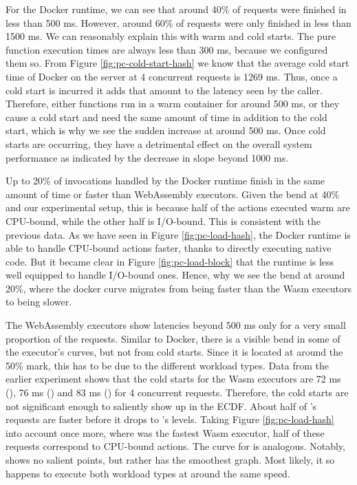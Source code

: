 For the Docker runtime, we can see that around 40\% of requests were finished in less than 500 ms. However, around 60\% of requests were only finished in less than 1500 ms. We can reasonably explain this with warm and cold starts. The pure function execution times are always less than 300 ms, because we configured them so. From Figure \ref{fig:pc-cold-start-hash} we know that the average cold start time of Docker on the server at 4 concurrent requests is 1269 ms. Thus, once a cold start is incurred it adds that amount to the latency seen by the caller. Therefore, either functions run in a warm container for around 500 ms, or they cause a cold start and need the same amount of time in addition to the cold start, which is why we see the sudden increase at around 500 ms. Once cold starts are occurring, they have a detrimental effect on the overall system performance as indicated by  the decrease in slope beyond 1000 ms.

Up to 20\% of invocations handled by the Docker runtime finish in the same amount of time or faster than WebAssembly executors. Given the bend at 40\% and our experimental setup, this is because half of the actions executed warm are CPU-bound, while the other half is I/O-bound. This is consistent with the previous data. As we have seen in Figure \ref{fig:pc-load-hash}, the Docker runtime is able to handle CPU-bound actions faster, thanks to directly executing native code. But it became clear in Figure \ref{fig:pc-load-block} that the runtime is less well equipped to handle I/O-bound ones. Hence, why we see the bend at around 20\%, where the docker curve migrates from being faster than the Wasm executors to being slower.

The WebAssembly executors show latencies beyond 500 ms only for a very small proportion of the requests.
Similar to Docker, there is a visible bend in some of the executor's curves, but not from cold starts. Since it is located at around the 50\% mark, this has to be due to the different workload types. Data from the earlier experiment shows that the cold starts for the Wasm executors are 72 ms (), 76 ms () and 83 ms () for 4 concurrent requests. Therefore, the cold starts are not significant enough to saliently show up in the ECDF.
About half of 's requests are faster before it drops to 's levels. Taking Figure \ref{fig:pc-load-hash} into account once more, where  was the fastest Wasm executor, half of these requests correspond to CPU-bound actions. The curve for  is analogous. Notably,  shows no salient points, but rather has the smoothest graph. Most likely, it so happens to execute both workload types at around the same speed.


